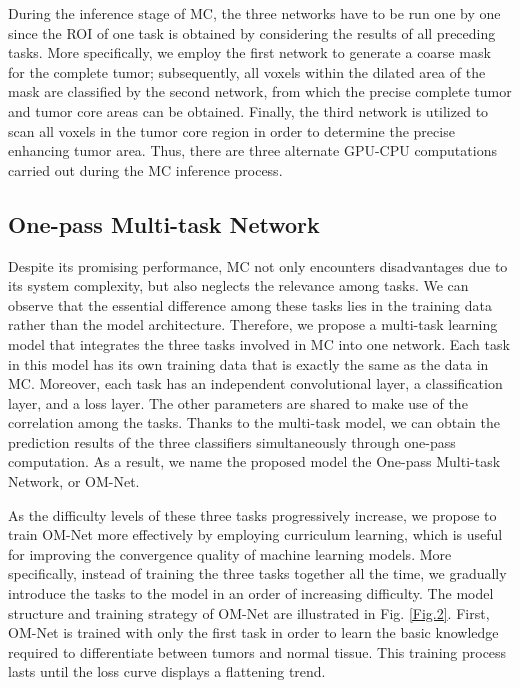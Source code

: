 \documentclass[journal,twoside]{IEEEtran}
\begin{document}
During the inference stage of MC, the three networks have to be run one by one since the ROI of one task is obtained by considering the results of all preceding tasks. More specifically, we employ the first network to generate a coarse mask for the complete tumor; subsequently, all voxels within the dilated area of the mask are classified by the second network, from which the precise complete tumor and tumor core areas can be obtained. Finally, the third network is utilized to scan all voxels in the tumor core region in order to determine the precise enhancing tumor area. Thus, there are three alternate GPU-CPU computations carried out during the MC inference process.




\subsection{One-pass Multi-task Network}
Despite its promising performance, MC not only encounters disadvantages due to its system complexity, but also neglects the relevance among tasks. We can observe that the essential difference among these tasks lies in the training data rather than the model architecture. Therefore, we propose a multi-task learning model that integrates the three tasks involved in MC into one network. Each task in this model has its own training data that is exactly the same as the data in MC. Moreover, each task has an independent convolutional layer, a classification layer, and a loss layer. The other parameters are shared to make use of the correlation among the tasks. Thanks to the multi-task model, we can obtain the prediction results of the three classifiers simultaneously through one-pass computation. As a result, we name the proposed model the One-pass Multi-task Network, or OM-Net.



As the difficulty levels of these three tasks progressively increase, we propose to train OM-Net more effectively by employing curriculum learning\cite{bengio2009curriculum}, which is useful for improving the convergence quality of machine learning models. More specifically, instead of training the three tasks together all the time, we gradually introduce the tasks to the model in an order of increasing difficulty. The model structure and training strategy of OM-Net are illustrated in Fig. \ref{Fig.2}. First, OM-Net is trained with only the first task in order to learn the basic knowledge required to differentiate between tumors and normal tissue. This training process lasts until the loss curve displays a flattening trend.
\end{document}

